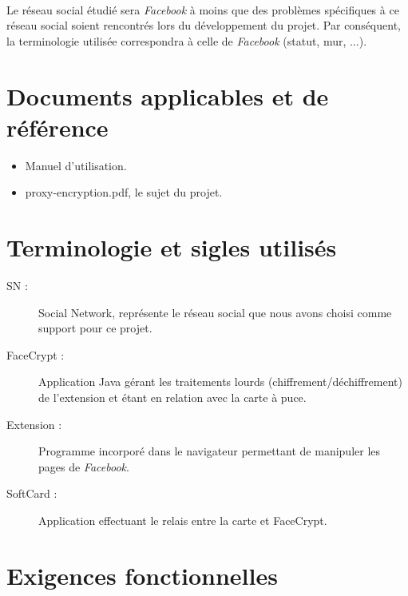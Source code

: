 \documentclass[a4paper,11pt,french]{article}
\begin{document}
\paragraph{}
Le réseau social étudié sera \emph{Facebook} à moins que des problèmes spécifiques
à ce réseau social soient rencontrés lors du développement du projet.
Par conséquent, la terminologie utilisée correspondra à celle de \emph{Facebook} 
(statut, mur, ...).

\section{Documents applicables et de référence}
\begin{itemize}
    \item Manuel d'utilisation.
    \item proxy-encryption.pdf, le sujet du projet.
\end{itemize}


\section{Terminologie et sigles utilisés}
\begin{description}
	\item[SN :] Social Network, représente le réseau social que nous 
	avons choisi comme support pour ce projet.
    \item[FaceCrypt :] Application Java gérant les traitements lourds 
    (chiffrement/déchiffrement) de l'extension et étant en relation avec
	la carte à puce.
    \item[Extension :] Programme incorporé dans le navigateur permettant
    de manipuler les pages de \emph{Facebook}.
    \item[SoftCard :] Application effectuant le relais entre la carte
        et FaceCrypt.
\end{description}

\section{Exigences fonctionnelles}
\end{document}
